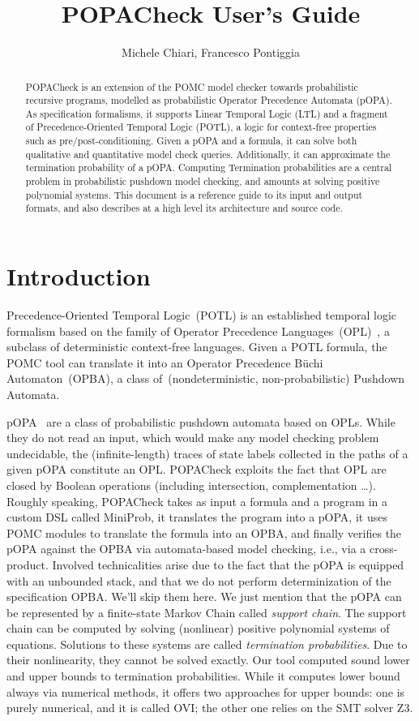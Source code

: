 \documentclass[9pt,a4paper]{article}
\title{POPACheck User's Guide}
\author{Michele Chiari, Francesco Pontiggia}
\date{}
\begin{document}
\maketitle

\begin{abstract}
POPACheck is an extension of the POMC model checker towards probabilistic recursive programs, modelled as probabilistic Operator Precedence Automata (pOPA). As specification formalisms, it supports Linear Temporal Logic (LTL) and a fragment of Precedence-Oriented Temporal Logic (POTL), a logic for context-free properties such as pre/post-conditioning. Given a pOPA and a formula, it can solve both qualitative and quantitative model check queries. Additionally, it can approximate the termination probability of a pOPA. Computing Termination probabilities are a central problem in probabilistic pushdown model checking, and amounts at solving positive polynomial systems.
This document is a reference guide to its input and output formats, and also describes at a high level its architecture and source code.
\end{abstract}

\section{Introduction}
Precedence-Oriented Temporal Logic~(POTL) \cite{ChiariMP21,ChiariMP21b} is an established temporal
logic formalism based on the family of Operator Precedence Languages~(OPL)~\cite{MP18},
a subclass of deterministic context-free languages.
Given a POTL formula, the POMC tool can translate it into an Operator Precedence Büchi Automaton~(OPBA), a class of~(nondeterministic, non-probabilistic) Pushdown Automata.

pOPA~\cite{abs-2404-03515} are a class of probabilistic pushdown automata based on OPLs. While they do not read an input, which would make any model checking problem undecidable, the (infinite-length) traces of state labels collected in the paths of a given pOPA constitute an OPL. POPACheck exploits the fact that OPL are closed by Boolean operations (including intersection, complementation \dots). Roughly speaking, POPACheck takes as input a formula and a program in a custom DSL called MiniProb, it translates the program into a pOPA, it uses POMC modules to translate the formula into an OPBA, and finally verifies the pOPA against the OPBA via automata-based model checking, i.e., via a cross-product. Involved technicalities arise due to the fact that the pOPA is equipped with an unbounded stack, and that we do not perform determinization of the specification OPBA. We'll skip them here. We just mention that the pOPA can be represented by a finite-state Markov Chain called \emph{support chain}. The support chain can be computed by solving (nonlinear) positive polynomial systems of equations. Solutions to these systems are called \emph{termination probabilities}. Due to their nonlinearity, they cannot be solved exactly. Our tool computed sound lower and upper bounds to termination probabilities. While it computes lower bound always via numerical methods, it offers two approaches for upper bounds: one is purely numerical, and it is called OVI; the other one relies on the SMT solver Z3.
\end{document}
